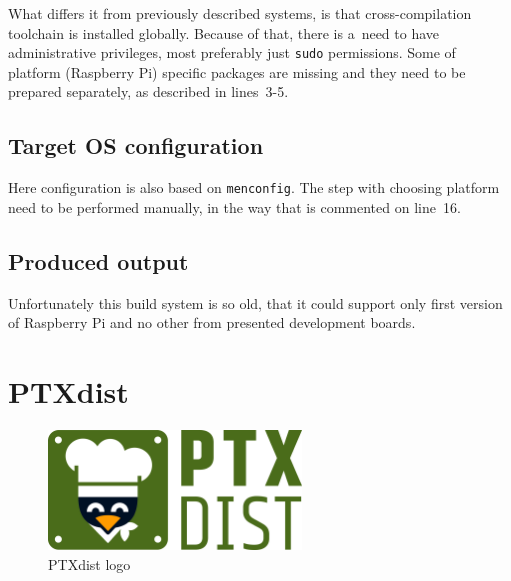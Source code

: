 \documentclass[printmode]{mgr}
\begin{document}
What differs it from previously described systems, is that cross-compilation toolchain is installed globally.
Because of that, there is a~need to have administrative privileges, most preferably just \verb|sudo| permissions.
Some of platform (Raspberry Pi) specific packages are missing and they need to be prepared separately, as described in lines~3-5.

\subsection*{Target OS configuration}

Here configuration is also based on \verb|menconfig|.
The step with choosing platform need to be performed manually, in the way that is commented on line~16.

\subsection*{Produced output}

Unfortunately this build system is so old, that it could support only first version of Raspberry Pi and no other from presented development boards.





\section{PTXdist}





\begin{figure}[htbp]
  \centering
    \includegraphics[width=0.6\textwidth]{ptxdist-logo.png}
    \caption{PTXdist logo}
  \label{fig:ptxdist-logo}
\end{figure}
\end{document}
